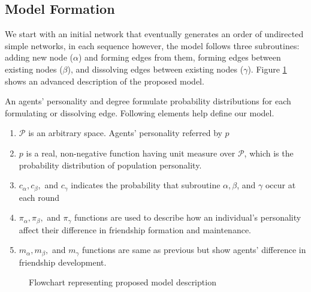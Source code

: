 \documentclass[runningheads]{llncs}
\begin{document}
\subsection{Model Formation}
We start with an initial network that eventually generates an order of undirected simple networks, in each sequence however, the model follows three subroutines: adding new node ($\alpha$) and forming edges from them, forming edges between existing nodes ($\beta$), and dissolving edges between existing nodes ($\gamma$). Figure \ref{fig_1} shows an advanced description of the proposed model.

An agents’ personality and degree formulate probability distributions for each formulating or dissolving edge. Following elements help define our model.
\begin{enumerate}
  \item $\mathcal{P}$ is an arbitrary space. Agents’ personality referred by $p$
  \item $p$ is a real, non-negative function having unit measure over $\mathcal{P}$, which is the probability distribution of population personality.
  \item $c_\alpha,c_\beta,$ and $c_\gamma$ indicates the probability that subroutine $\alpha, \beta$, and $\gamma$ occur at each round
  \item $\pi_\alpha,\pi_\beta,$ and $\pi_\gamma$ functions are used to describe how an individual’s personality affect their difference in friendship formation and maintenance.
  \item $m_\alpha,m_\beta,$ and $m_\gamma$ functions are same as previous but show agents’ difference in friendship development. 
\end{enumerate}

\begin{figure}
\centering
{}
\caption{Flowchart representing proposed model description} \label{fig_1}
\end{figure}
\end{document}
